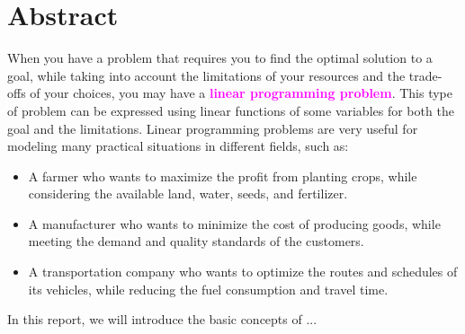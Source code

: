 \newpage
\section{Abstract}
\qquad When you have a problem that requires you to find the optimal solution to a goal, while taking into account the limitations of your resources and the trade-offs of your choices, you may have a \textcolor{magenta}{\textbf{linear programming problem}}. This type of problem can be expressed using linear functions of some variables for both the goal and the limitations. Linear programming problems are very useful for modeling many practical situations in different fields, such as:

\begin{itemize}
	\item A farmer who wants to maximize the profit from planting crops, while considering the available land, water, seeds, and fertilizer.
	\item A manufacturer who wants to minimize the cost of producing goods, while meeting the demand and quality standards of the customers.
	\item A transportation company who wants to optimize the routes and schedules of its vehicles, while reducing the fuel consumption and travel time.\\
\end{itemize}

\qquad In this report, we will introduce the basic concepts of ...
